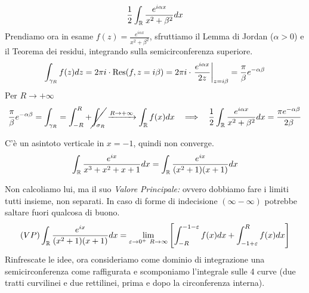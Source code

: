 \begin{equation*}
\frac{1}{2}\int _{\mathbb{R} }\frac{e^{i\alpha x}}{x^{2} + \beta ^{2}} dx
\end{equation*}Prendiamo ora in esame $f(z) = \frac{e^{i\alpha x}}{x^{2} + \beta ^{2}}$, sfruttiamo il Lemma di Jordan ($\alpha  > 0$) e il Teorema dei residui, integrando sulla semicirconferenza superiore.
\begin{equation*}
\int _{\gamma _{R}} f(z) dz = 2\pi i\cdot \operatorname{Res} (f,z = i\beta) = 2\pi i\cdot \left. \frac{e^{i\alpha x}}{2z}\right| _{z = i\beta } = \frac{\pi }{\beta } e^{ - \alpha \beta }
\end{equation*}
Per $R\rightarrow + \infty $
\begin{equation*}
\frac{\pi }{\beta } e^{ - \alpha \beta } = \int _{\gamma _{R}} = \int ^{R}_{ - R} + \cancel{\int _{\sigma _{R}}}\xrightarrow{R\rightarrow + \infty }\int _{\RR } f(x) dx\ \ \implies \ \ \frac{1}{2}\int _{\RR }\frac{e^{i\alpha x}}{x^{2} + \beta ^{2}} dx = \frac{\pi e^{ - \alpha \beta }}{2\beta }
\end{equation*}
\Soluzione

C'è un asintoto verticale in $x = -1$, quindi non converge.\begin{equation*}
\int _{\mathbb{R} }\frac{e^{ix}}{x^{3} + x^{2} + x + 1} dx = \int _{\mathbb{R} }\frac{e^{ix}}{(x^{2} + 1)(x + 1)} dx
\end{equation*}

Non calcoliamo lui, ma il suo \textit{Valore Principale:} ovvero dobbiamo fare i limiti tutti insieme, non separati. In caso di forme di indecisione $(\infty - \infty)$ potrebbe saltare fuori qualcosa di buono.
\begin{equation*}
(VP)\int _{\mathbb{R} }\frac{e^{ix}}{(x^{2} + 1)(x + 1)} dx = \lim _{\varepsilon \rightarrow 0^{ + } \ R\rightarrow \infty }\left[\int ^{ - 1 - \varepsilon }_{ - R} f(x)dx + \int ^{R}_{ - 1 + \varepsilon } f(x)dx\right]
\end{equation*}
Rinfrescate le idee, ora consideriamo come dominio di integrazione una semicirconferenza come raffigurata e scomponiamo l'integrale sulle 4 curve (due tratti curvilinei e due rettilinei, prima e dopo la circonferenza interna).


